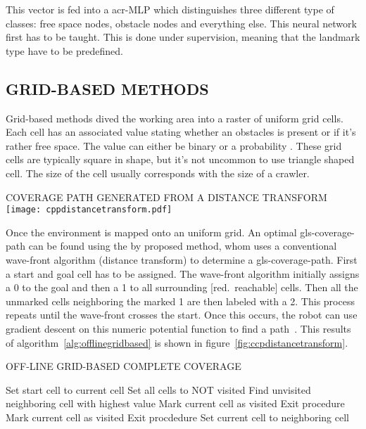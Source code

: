 This vector is fed into a \gls{acr-MLP} which distinguishes three different type of classes: free space nodes,
obstacle nodes and everything else. This neural network first has to be taught. This is done under supervision, meaning
that the landmark type have to be predefined.

\subsection{GRID-BASED METHODS}
Grid-based methods dived the working area into a raster of uniform grid cells. Each cell has an associated value stating
whether an obstacles is present or if it's rather free space. The value can either be binary or a probability
\cite{galceran_coverage_2014}. These grid cells are typically square in shape, but it's not uncommon to use triangle
shaped cell. The size of the cell usually corresponds with the size of a crawler.

\begin{RoyalFigure}[!htb, label=fig:ccpdistancetransform]{COVERAGE PATH GENERATED FROM A DISTANCE TRANSFORM~\cite{wong_qualitative_2006}}
	\texttt{[image: cppdistancetransform.pdf]}
\end{RoyalFigure}

Once the environment is mapped onto an uniform grid. An optimal \gls{gls-coverage-path} can be found using the by
\citet{zelinsky_coverage_1998} proposed method, whom uses a conventional wave-front algorithm (distance transform) to
determine a \gls{gls-coverage-path}. First a start and goal cell has to be assigned. The wave-front algorithm initially
assigns a 0 to the goal and then a 1 to all surrounding [red.~reachable] cells. Then all the unmarked cells neighboring
the marked 1 are then labeled with a 2. This process repeats until the wave-front crosses the start. Once this occurs,
the robot can use gradient descent on this numeric potential function to find a path~\cite{choset_coverage_2001}. This
results of algorithm~\ref{alg:offlinegridbased} is shown in figure~\ref{fig:ccpdistancetransform}.

\begin{RoyalAlgorithm}[label=alg:offlinegridbased]{OFF-LINE GRID-BASED COMPLETE COVERAGE}
	\begin{algorithmic}[1]
		\State Set start cell to current cell
		\State Set all cells to NOT visited
		\Loop
			\State Find unvisited neighboring cell with highest value
				\State Mark current cell as visited
				\State Exit procedure 
			\EndIf
				\State Mark current cell as visited
				\State Exit procdedure 
			\EndIf
			\State Set current cell to neighboring cell 
		\EndLoop
		\EndProcedure
	\end{algorithmic}
\end{RoyalAlgorithm}


